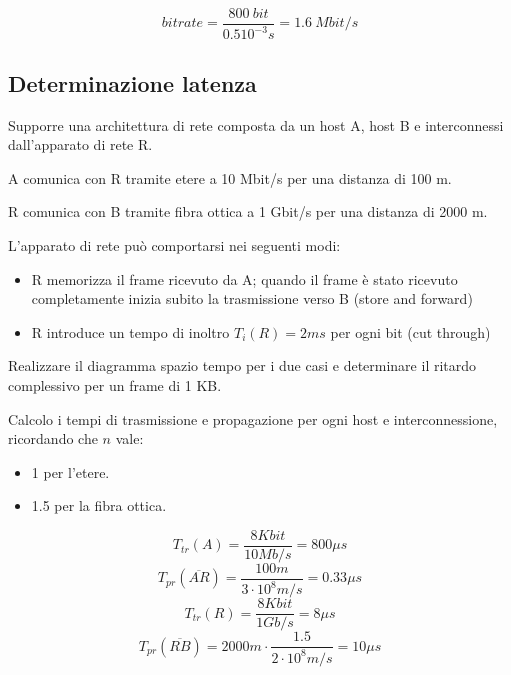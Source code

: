         \begin{equation*}
            bitrate = \frac{800 ~ bit}{0.5 10^{-3} s}  = 1.6 ~ Mbit/s
        \end{equation*}

        

    \subsection{Determinazione latenza}
        \problem
        Supporre una architettura di rete composta da un host A, host B e interconnessi dall'apparato di rete R.

        A comunica con R tramite etere a 10 Mbit/s per una distanza di 100 m.
        
        R comunica con B tramite fibra ottica a 1 Gbit/s per una distanza di 2000 m.
        
        L'apparato di rete può comportarsi nei seguenti modi:
        \begin{itemize}
            \item R memorizza il frame ricevuto da A; quando il frame è stato ricevuto completamente inizia subito la trasmissione verso B (store and forward)
            \item R introduce un tempo di inoltro $T_i(R) = 2 ms$ per ogni bit (cut through)
        \end{itemize}
        
        Realizzare il diagramma spazio tempo per i due casi e determinare il ritardo complessivo per un frame di 1 KB.

        \solution
        Calcolo i tempi di trasmissione e propagazione per ogni host e interconnessione, ricordando che $n$ vale:
        \begin{itemize}
            \item 1 per l'etere.
            \item 1.5 per la fibra ottica.
        \end{itemize}
        
        \begin{equation*}
            T_{tr}(A) = \frac{8K bit}{10Mb/s} = 800 \mu s
        \end{equation*}
        \begin{equation*}
            T_{pr}(\overline{AR}) = \frac{100m}{3 \cdot 10^8 m/s} = 0.33 \mu s
        \end{equation*}
        \begin{equation*}
            T_{tr}(R) = \frac{8Kbit}{1Gb/s} = 8 \mu s
        \end{equation*}
        \begin{equation*}
            T_{pr}(\overline{RB}) = 2000m \cdot \frac{1.5}{2 \cdot 10^8 m/s} = 10 \mu s
        \end{equation*}
        

